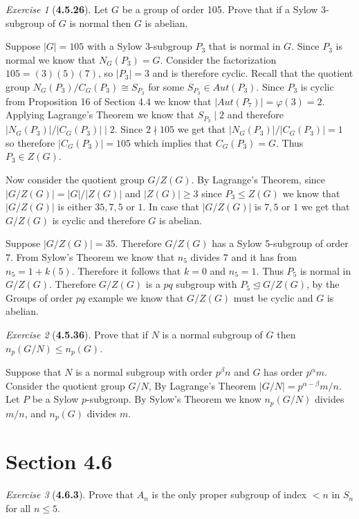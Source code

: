 \documentclass[12pt]{amsart}
\makeatletter
\theoremstyle{remark}
\newtheorem*{exercise}{Exercise}%
\renewenvironment{proof}[1][\proofname]{\par\doublespacing
  \pushQED{\qed}%
  \normalfont \topsep6\p@\@plus6\p@\relax
  \list{}{%
    \settowidth{\leftmargin}{\itshape\proofname:\hskip\labelsep}%
    \setlength{\labelwidth}{0pt}%
    \setlength{\itemindent}{-\leftmargin}%
  }%
  \item[\hskip\labelsep\itshape#1\@addpunct{:}]\ignorespaces
}{%
  \popQED\endlist\@endpefalse
  \singlespacing
}
\theoremstyle{mycomment}
\makeatother
\begin{document}
\begin{exercise}[\textbf{4.5.26}] Let $G$ be a group of order 105. Prove that if a Sylow 3-subgroup of $G$ is normal then 
  $G$ is abelian. 
   \begin{proof}
    Suppose $|G| = 105$ with a Sylow 3-subgroup $P_3$ that is normal in $G$. Since $P_3$ is normal we know that $N_G(P_3) = G$. Consider the factorization
    $105 = (3)(5)(7)$, so $|P_3| = 3$ and is therefore cyclic. Recall that the quotient group $N_G(P_3)/C_G(P_3) \cong S_{P_3}$ for some $S_{P_3} \in Aut(P_3)$. Since $P_3$ is cyclic from Proposition 16 of Section 4.4 we know that $|Aut(P_7)| = \varphi(3) = 2$. Applying Lagrange's Theorem we know that  $S_{P_3} \mid 2$ and therefore $|N_G(P_3)|/|C_G(P_3)| \mid 2$. Since $2\nmid 105$ we get that $|N_G(P_3)|/|C_G(P_3)| = 1$ so therefore $|C_G(P_3)| = 105$ which implies that $C_G(P_3) = G$. Thus $P_3 \in Z(G)$.

    
    Now consider the quotient group $G/Z(G)$. By Lagrange's Theorem, since $|G/Z(G)| = |G|/|Z(G)|$ and $|Z(G)| \geq 3$ since $P_3 \leq Z(G)$
    we know that $|G/Z(G)|$ is either $35, 7, 5$ or $1$. In case that $|G/Z(G)|$ is $7, 5$ or $1$ we get that $G/Z(G)$ is cyclic and therefore $G$ is abelian. 
    
    
    Suppose $|G/Z(G)| = 35$. Therefore $G/Z(G)$ has a Sylow 5-subgroup of order $7$. From Sylow's Theorem we know that $n_{5}$ divides $7$
    and it has from $n_5 = 1 + k(5)$. Therefore it follows that $k = 0$ and $n_5 = 1$. Thus $P_5$ is normal in $G/Z(G)$.
    Therefore $G/Z(G)$ is a $pq$ subgroup with $P_5 \trianglelefteq G/Z(G)$, by the Groups of order $pq$ example we know that 
    $G/Z(G)$ must be cyclic and $G$ is abelian.  
    \end{proof}
\end{exercise}
\vspace{.15in}



\begin{exercise}[\textbf{4.5.36}] Prove that if $N$ is a normal subgroup of $G$ then $n_p(G/N) \leq n_p(G)$. 
   \begin{proof} Suppose that $N$ is a normal subgroup with order $p^{\beta}n$ and $G$ has order $p^\alpha m$. 
    Consider the quotient group $G/N$, By Lagrange's Theorem $|G/N| = p^{\alpha - \beta} m/n$. Let $P$ be a Sylow 
    $p$-subgroup. By Sylow's Theorem we know $n_p(G/N)$ divides $m/n$, and $n_p(G)$ divides $m$.
    \end{proof}
\end{exercise}
\vspace{.15in}


\section*{\textbf{Section 4.6}}

\begin{exercise}[\textbf{4.6.3}] Prove that $A_n$ is the only proper subgroup of index $<n$ in $S_n$ for all $n\leq 5$.
  \begin{proof} 
    \end{proof}
\end{exercise}
\vspace{.15in}
\end{document}
